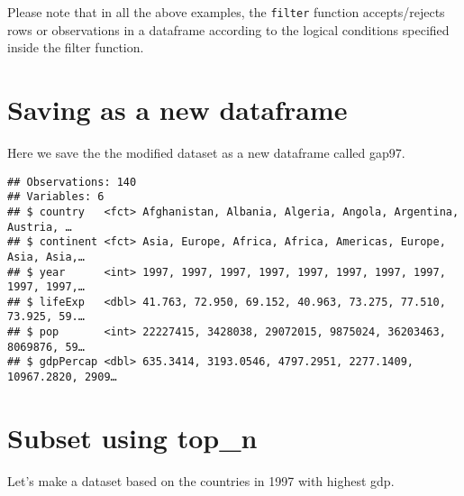 \documentclass[]{book}
\newenvironment{Shaded}{\begin{snugshade}}{\end{snugshade}}
\newcommand{\KeywordTok}[1]{\textcolor[rgb]{0.13,0.29,0.53}{\textbf{#1}}}
\newcommand{\DataTypeTok}[1]{\textcolor[rgb]{0.13,0.29,0.53}{#1}}
\newcommand{\DecValTok}[1]{\textcolor[rgb]{0.00,0.00,0.81}{#1}}
\newcommand{\StringTok}[1]{\textcolor[rgb]{0.31,0.60,0.02}{#1}}
\newcommand{\CommentTok}[1]{\textcolor[rgb]{0.56,0.35,0.01}{\textit{#1}}}
\newcommand{\OperatorTok}[1]{\textcolor[rgb]{0.81,0.36,0.00}{\textbf{#1}}}
\newcommand{\NormalTok}[1]{#1}
\begin{document}
Please note that in all the above examples, the \texttt{filter} function
accepts/rejects rows or observations in a dataframe according to the
logical conditions specified inside the filter function.

\section{Saving as a new dataframe}\label{saving-as-a-new-dataframe}

Here we save the the modified dataset as a new dataframe called gap97.

\begin{Shaded}
\end{Shaded}

\begin{verbatim}
## Observations: 140
## Variables: 6
## $ country   <fct> Afghanistan, Albania, Algeria, Angola, Argentina, Austria, …
## $ continent <fct> Asia, Europe, Africa, Africa, Americas, Europe, Asia, Asia,…
## $ year      <int> 1997, 1997, 1997, 1997, 1997, 1997, 1997, 1997, 1997, 1997,…
## $ lifeExp   <dbl> 41.763, 72.950, 69.152, 40.963, 73.275, 77.510, 73.925, 59.…
## $ pop       <int> 22227415, 3428038, 29072015, 9875024, 36203463, 8069876, 59…
## $ gdpPercap <dbl> 635.3414, 3193.0546, 4797.2951, 2277.1409, 10967.2820, 2909…
\end{verbatim}

\section{Subset using top\_n}\label{subset-using-top_n}

Let's make a dataset based on the countries in 1997 with highest gdp.

\begin{Shaded}
\end{Shaded}
\end{document}
